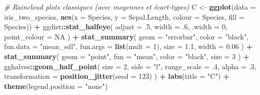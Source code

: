 \documentclass[
  french,
]{book}
\newenvironment{Shaded}{\begin{snugshade}}{\end{snugshade}}
\newcommand{\CommentTok}[1]{\textcolor[rgb]{0.56,0.35,0.01}{\textit{#1}}}
\newcommand{\DataTypeTok}[1]{\textcolor[rgb]{0.13,0.29,0.53}{#1}}
\newcommand{\DecValTok}[1]{\textcolor[rgb]{0.00,0.00,0.81}{#1}}
\newcommand{\FloatTok}[1]{\textcolor[rgb]{0.00,0.00,0.81}{#1}}
\newcommand{\KeywordTok}[1]{\textcolor[rgb]{0.13,0.29,0.53}{\textbf{#1}}}
\newcommand{\NormalTok}[1]{#1}
\newcommand{\OperatorTok}[1]{\textcolor[rgb]{0.81,0.36,0.00}{\textbf{#1}}}
\newcommand{\OtherTok}[1]{\textcolor[rgb]{0.56,0.35,0.01}{#1}}
\newcommand{\StringTok}[1]{\textcolor[rgb]{0.31,0.60,0.02}{#1}}
\begin{document}
\begin{Shaded}
\begin{Highlighting}[]
\CommentTok{# Raincloud plots classiques (avec moyennes et écart-types)}
\NormalTok{C <-}
\StringTok{  }\KeywordTok{ggplot}\NormalTok{(}\DataTypeTok{data =}\NormalTok{ iris_two_species, }
         \KeywordTok{aes}\NormalTok{(}\DataTypeTok{x =}\NormalTok{ Species, }\DataTypeTok{y =}\NormalTok{ Sepal.Length, }\DataTypeTok{colour =}\NormalTok{ Species, }\DataTypeTok{fill =}\NormalTok{ Species)) }\OperatorTok{+}
\StringTok{  }\NormalTok{ggdist}\OperatorTok{::}\KeywordTok{stat_halfeye}\NormalTok{(}
    \DataTypeTok{adjust =} \FloatTok{.5}\NormalTok{, }
    \DataTypeTok{width =} \FloatTok{.6}\NormalTok{, }
    \DataTypeTok{.width =} \DecValTok{0}\NormalTok{, }
    \DataTypeTok{point_colour =} \OtherTok{NA}
\NormalTok{    ) }\OperatorTok{+}
\StringTok{  }\KeywordTok{stat_summary}\NormalTok{(}
    \DataTypeTok{geom =} \StringTok{"errorbar"}\NormalTok{,}
    \DataTypeTok{color =} \StringTok{"black"}\NormalTok{,}
    \DataTypeTok{fun.data =} \StringTok{"mean_sdl"}\NormalTok{,}
    \DataTypeTok{fun.args =} \KeywordTok{list}\NormalTok{(}\DataTypeTok{mult =} \DecValTok{1}\NormalTok{),}
    \DataTypeTok{size =} \FloatTok{1.1}\NormalTok{, }
    \DataTypeTok{width =} \FloatTok{0.06}
\NormalTok{    ) }\OperatorTok{+}\StringTok{ }
\StringTok{  }\KeywordTok{stat_summary}\NormalTok{(}
    \DataTypeTok{geom =} \StringTok{"point"}\NormalTok{,}
    \DataTypeTok{fun =} \StringTok{"mean"}\NormalTok{, }
    \DataTypeTok{color =} \StringTok{"black"}\NormalTok{,}
    \DataTypeTok{size =} \DecValTok{3}
\NormalTok{    ) }\OperatorTok{+}
\StringTok{  }\NormalTok{gghalves}\OperatorTok{::}\KeywordTok{geom_half_point}\NormalTok{(}
    \DataTypeTok{size =} \DecValTok{2}\NormalTok{, }
    \DataTypeTok{side =} \StringTok{"l"}\NormalTok{, }
    \DataTypeTok{range_scale =} \FloatTok{.4}\NormalTok{, }
    \DataTypeTok{alpha =} \FloatTok{.3}\NormalTok{,}
    \DataTypeTok{transformation =} \KeywordTok{position_jitter}\NormalTok{(}\DataTypeTok{seed =} \DecValTok{123}\NormalTok{)}
\NormalTok{  ) }\OperatorTok{+}
\StringTok{  }\KeywordTok{labs}\NormalTok{(}\DataTypeTok{title =} \StringTok{"C"}\NormalTok{) }\OperatorTok{+}
\StringTok{  }\KeywordTok{theme}\NormalTok{(}\DataTypeTok{legend.position =} \StringTok{"none"}\NormalTok{)}



\end{Highlighting}
\end{Shaded}
\end{document}
